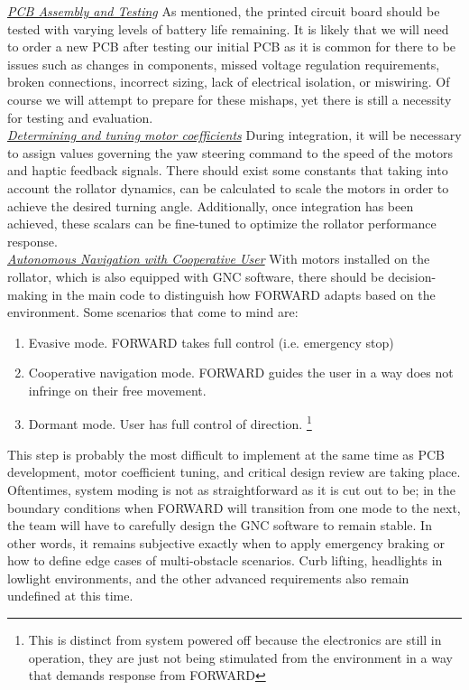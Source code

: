 \noindent \underline{\textit{PCB Assembly and Testing}}
\noindent As mentioned, the printed circuit board should be tested with varying levels of battery life remaining. It is likely that we will need to order a new PCB after testing our initial PCB as it is common for there to be issues such as changes in components, missed voltage regulation requirements, broken connections, incorrect sizing, lack of electrical isolation, or miswiring. Of course we will attempt to prepare for these mishaps, yet there is still a necessity  for testing and evaluation.\\

\noindent \underline{\textit{Determining and tuning motor coefficients}} During integration, it will be necessary to assign values governing the yaw steering command to the speed of the motors and haptic feedback signals. There should exist some constants that taking into account the rollator dynamics, can be calculated to scale the motors in order to achieve the desired turning angle. Additionally, once integration has been achieved, these scalars can be fine-tuned to optimize the rollator performance response.\\

\noindent \underline{\textit{Autonomous Navigation with Cooperative User}}
\noindent With motors installed on the rollator, which is also equipped with GNC software, there should be decision-making in the main code to distinguish how FORWARD adapts based on the environment. Some scenarios that come to mind are:
\begin{enumerate}
	\item Evasive mode. FORWARD takes full control (i.e. emergency stop)
	\item Cooperative navigation mode. FORWARD guides the user in a way does not infringe on their free movement.
	\item Dormant mode. User has full control of direction. \footnote{This is distinct from system powered off because the electronics are still in operation, they are just not being stimulated from the environment in a way that demands response from FORWARD}
\end{enumerate}
This step is probably the most difficult to implement at the same time as PCB development, motor coefficient tuning, and critical design review are taking place. Oftentimes, system moding is not as straightforward as it is cut out to be; in the boundary conditions when FORWARD will transition from one mode to the next, the team will have to carefully design the GNC software to remain stable. In other words, it remains subjective exactly when to apply emergency braking or how to define edge cases of multi-obstacle scenarios. Curb lifting, headlights in lowlight environments, and the other advanced requirements also remain undefined at this time.\\


